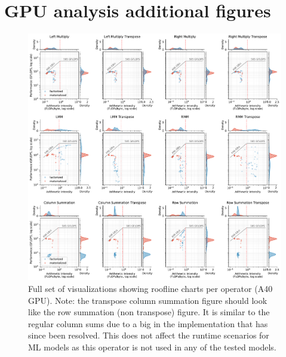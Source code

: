 \chapter{GPU analysis additional figures}
\label{appendix:analysis-additional-figures}
\begin{figure}[ht]
    \centering
    \includegraphics[width=1.0\textwidth]{appendices/figures/roofline-operators.pdf}
    \caption{Full set of visualizations showing roofline charts per operator (A40 GPU). Note: the transpose column summation figure should look like the row summation (non transpose) figure. It is similar to the regular column sums due to a big in the implementation that has since been resolved. This does not affect the runtime scenarios for ML models as this operator is not used in any of the tested models.}
    \label{fig:additional-operator-rooflines}
\end{figure}
